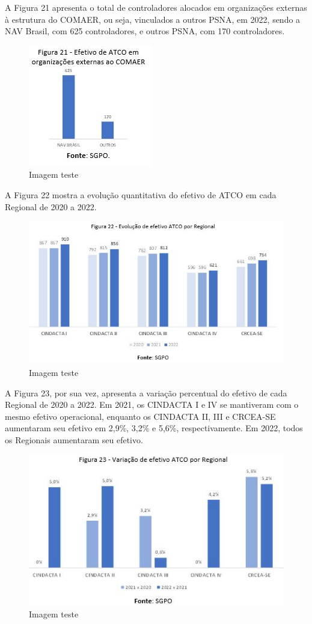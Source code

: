 \documentclass[
]{book}
\begin{document}
A Figura 21 apresenta o total de controladores alocados em organizações externas à estrutura do COMAER, ou seja, vinculados a outros PSNA, em 2022, sendo a NAV Brasil, com 625 controladores, e outros PSNA, com 170 controladores.

\begin{figure}
\centering
\includegraphics{imagens/fig24.jpg}
\caption{Imagem teste}
\end{figure}

A Figura 22 mostra a evolução quantitativa do efetivo de ATCO em cada Regional de 2020 a 2022.

\begin{figure}
\centering
\includegraphics{imagens/fig25.jpg}
\caption{Imagem teste}
\end{figure}

A Figura 23, por sua vez, apresenta a variação percentual do efetivo de cada Regional de 2020 a 2022. Em 2021, os CINDACTA I e IV se mantiveram com o mesmo efetivo operacional, enquanto os CINDACTA II, III e CRCEA-SE aumentaram seu efetivo em 2,9\%, 3,2\% e 5,6\%, respectivamente. Em 2022, todos os Regionais aumentaram seu efetivo.

\begin{figure}
\centering
\includegraphics{imagens/fig26.jpg}
\caption{Imagem teste}
\end{figure}
\end{document}

